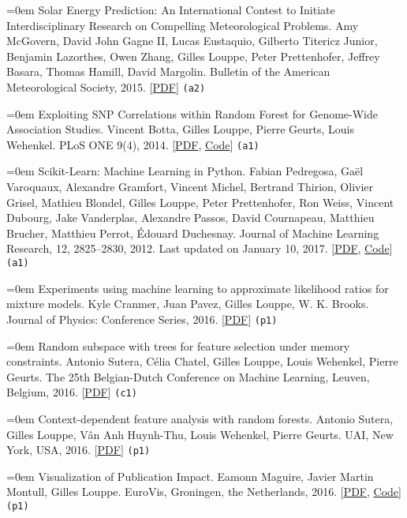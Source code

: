\documentclass{scrartcl}
\newcommand{\MarginText}[1]{\marginpar{\raggedleft\itshape\small#1}}
\newcommand{\NewPublication}[4]{\noindent\hangindent=0em\hangafter=0 \MarginText{\color{black} #1}{\footnotesize [{\color{Maroon}#2}]} #3 {\footnotesize\color{gray}#4}\vspace{0.5em}}
\begin{document}
\begin{cv}{}
\NewPublication{}{3}{Solar Energy Prediction: An International Contest to Initiate Interdisciplinary Research on Compelling Meteorological Problems.}{%
Amy McGovern, David John Gagne II, Lucas Eustaquio, Gilberto Titericz Junior, Benjamin Lazorthes, Owen Zhang, Gilles Louppe, Peter Prettenhofer, Jeffrey Basara, Thomas Hamill, David Margolin.
Bulletin of the American Meteorological Society, 2015.
[\href{http://hdl.handle.net/2268/177115}{PDF}]
{\color{black}\tt (a2)}}

\NewPublication{}{2}{Exploiting SNP Correlations within Random Forest for Genome-Wide Association Studies.}{%
Vincent Botta, Gilles Louppe, Pierre Geurts, Louis Wehenkel.
PLoS ONE 9(4), 2014.
[\href{http://dx.plos.org/10.1371/journal.pone.0093379}{PDF}, \href{https://github.com/0asa/TTree-source}{Code}]
{\color{black}\tt (a1)}}

\NewPublication{}{1}{Scikit-Learn: Machine Learning in Python.}{%
Fabian Pedregosa, Ga\"el Varoquaux, Alexandre Gramfort, Vincent Michel, Bertrand Thirion, Olivier Grisel, Mathieu Blondel, Gilles Louppe, Peter Prettenhofer, Ron Weiss, Vincent Dubourg, Jake Vanderplas, Alexandre Passos, David Cournapeau, Matthieu Brucher, Matthieu Perrot, \'Edouard Duchesnay.
Journal of Machine Learning Research, 12, 2825--2830, 2012.
Last updated on January 10, 2017.
[\href{https://arxiv.org/abs/1201.0490}{PDF}, \href{https://http://scikit-learn.org}{Code}]
{\color{black}\tt (a1)}}



\NewPublication{in conference proceedings}{13}{Experiments using machine learning to approximate likelihood ratios for mixture models.}{%
Kyle Cranmer, Juan Pavez, Gilles Louppe, W. K. Brooks.
Journal of Physics: Conference Series, 2016.
[\href{http://iopscience.iop.org/article/10.1088/1742-6596/762/1/012034/pdf}{PDF}]
{\color{black}\tt (p1)}}

\NewPublication{}{12}{Random subspace with trees for feature selection under memory constraints.}{%
Antonio Sutera, C\'elia Chatel, Gilles Louppe, Louis Wehenkel, Pierre Geurts.
The 25th Belgian-Dutch Conference on Machine Learning, Leuven, Belgium, 2016.
[\href{http://hdl.handle.net/2268/202206}{PDF}]
{\color{black}\tt (c1)}}

\NewPublication{}{11}{Context-dependent feature analysis with random forests.}{%
Antonio Sutera, Gilles Louppe, V\^an Anh Huynh-Thu, Louis Wehenkel, Pierre Geurts.
UAI, New York, USA, 2016.
[\href{https://arxiv.org/abs/1605.03848}{PDF}]
{\color{black}\tt (p1)}}

\NewPublication{}{10}{Visualization of Publication Impact.}{%
Eamonn Maguire, Javier Martin Montull, Gilles Louppe.
EuroVis, Groningen, the Netherlands, 2016.
[\href{https://arxiv.org/abs/1605.06242}{PDF}, \href{https://github.com/inspirehep/impact-graphs}{Code}]
{\color{black}\tt (p1)}}


\end{cv}
\end{document}
